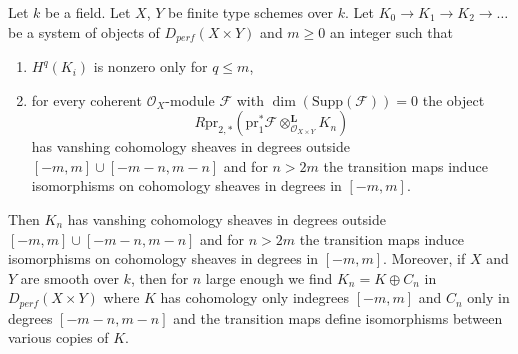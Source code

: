 \begin{lemma}
\label{lemma-bounded-fibres}
Let $k$ be a field. Let $X$, $Y$ be finite type schemes over $k$.
Let $K_0 \to K_1 \to K_2 \to \ldots$ be a system of objects
of $D_{perf}(X \times Y)$ and $m \geq 0$ an integer such that
\begin{enumerate}
\item $H^q(K_i)$ is nonzero only for $q \leq m$,
\item for every coherent $\mathcal{O}_X$-module $\mathcal{F}$ with
$\dim(\text{Supp}(\mathcal{F})) = 0$ the object
$$
R\text{pr}_{2, *}(
\text{pr}_1^*\mathcal{F} \otimes_{\mathcal{O}_{X \times Y}}^\mathbf{L}
K_n)
$$
has vanshing cohomology sheaves in degrees outside
$[-m, m] \cup [-m - n, m - n]$ and for $n > 2m$ the transition maps
induce isomorphisms on cohomology sheaves in degrees in $[-m, m]$.
\end{enumerate}
Then $K_n$ has vanshing cohomology sheaves in degrees outside
$[-m, m] \cup [-m - n, m - n]$ and for $n > 2m$ the
transition maps induce isomorphisms on cohomology sheaves in degrees in
$[-m, m]$. Moreover, if $X$ and $Y$ are smooth over $k$, then for $n$
large enough we find $K_n = K \oplus C_n$ in $D_{perf}(X \times Y)$
where $K$ has cohomology only indegrees $[-m, m]$ and $C_n$ only in
degrees $[-m - n, m - n]$ and the transition maps
define isomorphisms between various copies of $K$.
\end{lemma}

